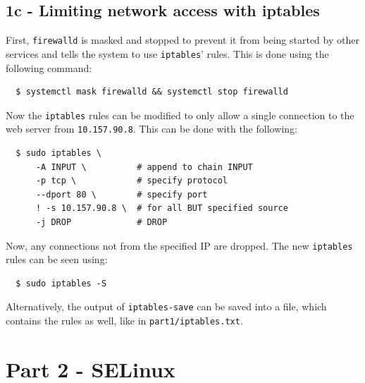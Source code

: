 \documentclass[11pt]{article}
\begin{document}
\subsection*{1c - Limiting network access with iptables}
First, \verb|firewalld| is masked and stopped to prevent it from being started by other services and tells the system to use
\verb|iptables|' rules. This is done using the following command:
\begin{verbatim}
  $ systemctl mask firewalld && systemctl stop firewalld
\end{verbatim}
Now the \verb|iptables| rules can be modified to only allow a single connection to the web server from \verb|10.157.90.8|.
This can be done with the following:
\begin{verbatim}
  $ sudo iptables \
      -A INPUT \          # append to chain INPUT
      -p tcp \            # specify protocol
      --dport 80 \        # specify port
      ! -s 10.157.90.8 \  # for all BUT specified source
      -j DROP             # DROP
\end{verbatim}
Now, any connections not from the specified IP are dropped. The new \verb|iptables| rules can be seen using:
\begin{verbatim}
  $ sudo iptables -S
\end{verbatim}
Alternatively, the output of \verb|iptables-save| can be saved into a file, which contains the rules as well, like in
\verb|part1/iptables.txt|.
\section*{Part 2 - SELinux}



\end{document}
